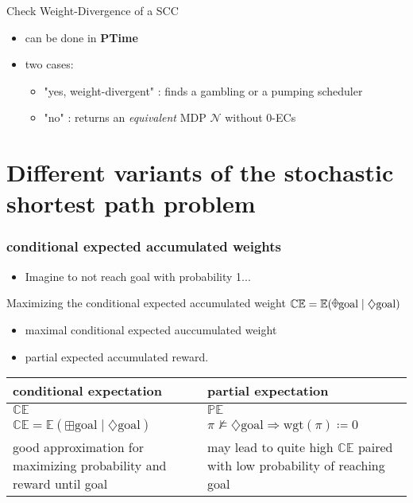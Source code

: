 \documentclass[onlymath]{beamer}
\begin{document}
\begin{frame}
\begin{block}{Check Weight-Divergence of a SCC}
	\begin{itemize}
		\item can be done in \textbf{PTime}
		\item two cases:
		\begin{itemize}
			\item "yes, weight-divergent" : finds a gambling or a pumping scheduler
			\item "no" : returns an \textit{equivalent} MDP $\mathcal{N}$ without 0-ECs
		\end{itemize}
	\end{itemize}
\end{block}
\end{frame}


\section{Different variants of the stochastic shortest path problem}

\begin{frame}
	\frametitle{conditional expected accumulated weights}
	\begin{itemize}
		\item Imagine to not reach goal with probability 1...
	\end{itemize}
	\begin{block}{Maximizing the conditional expected accumulated weight}
		$\mathbb{CE} = \mathbb{E}(\rawdiaplus \mathrm{goal}\mid \diamondsuit \mathrm{goal})$
	\end{block}
	\begin{itemize}
		\item maximal conditional expected auccumulated weight
		\item partial expected accumulated reward.
	\end{itemize}
\end{frame}

\begin{frame}
	\begin{tabular}{|p{5cm}|p{5cm}|}
		\hline
		conditional expectation & partial expectation \\ \hline
		$\mathbb{CE}$ & $\mathbb{PE}$ \\ \hline
		$\mathbb{CE} = \mathbb{E}(\boxplus \mathrm{goal}\mid \diamondsuit \mathrm{goal})$ & $\pi \nvDash \diamondsuit\mathrm{goal} \Rightarrow \mathrm{wgt}(\pi)\coloneqq0$ \\ \hline
		good approximation for \newline maximizing probability and reward until goal & may lead to quite high $\mathbb{CE}$ paired with \newline low probability of reaching goal \\ \hline
		
	\end{tabular}
\end{frame}
\end{document}
